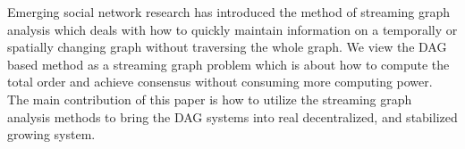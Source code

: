 Emerging social network research has introduced the method of streaming graph analysis \cite{ediger2011tracking, green2012fast, ediger2012stinger} which deals
with how to quickly maintain information on a temporally or spatially changing graph without traversing the whole graph. 
We view the DAG based method as a streaming graph problem which is about how to compute the total order and achieve consensus without consuming more computing power.
The main contribution of this paper is how to utilize the streaming graph analysis methods to bring the DAG systems into real decentralized, and stabilized growing system.
